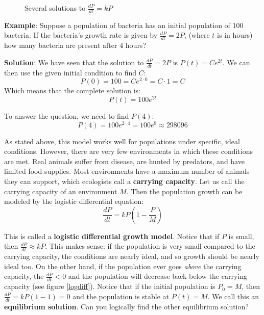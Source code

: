 \begin{figure}[htbp]
\centering
    \caption{Several solutions to $\frac{dP}{dt} = kP$}
    \label{expdiff}
\end{figure}


\textbf{Example}: Suppose a population of bacteria has an initial population 
of 100 bacteria. If the bacteria's growth rate is given by $\frac{dP}{dt} = 
2P$, (where $t$ is in hours) how many bacteria are present after 4 hours?

\textbf{Solution}: We have seen that the solution to $\frac{dP}{dt} = 2P$ is 
$P(t) = Ce^{2t}$. We can then use the given initial condition to find $C$:
$$P(0) = 100 = Ce^{2 \cdot 0} = C \cdot 1 = C$$
Which means that the complete solution is:
$$P(t) = 100 e^{2t}$$

To answer the question, we need to find $P(4)$:
$$P(4) = 100 e^{2 \cdot 4} = 100 e^{8} \approx 298096$$

As stated above, this model works well for populations under specific, ideal 
conditions. However, there are very few environments in which these conditions 
are met. Real animals suffer from disease, are hunted by predators, and have 
limited food supplies. Most environments have a maximum number of animals they 
can support, which ecologists call a \textbf{carrying capacity}. Let us call the carrying capacity of an environment $M$. Then the 
population growth can be modeled by the logistic differential equation: 
$$\frac{dP}{dt} = kP \left( 1 - \frac{P}{M} \right)$$

This is called a \textbf{logistic differential growth model}. Notice that if $P$ is small, then $\frac{dP}{dt} 
\approx kP$. This makes sense: if the population is very small compared to the 
carrying capacity, the conditions are nearly ideal, and so growth should be 
nearly ideal too. On the other hand, if the population ever goes \textit{
above} the carrying capacity, the $\frac{dP}{dt} < 0$ and the population will 
decrease back below the carrying capacity (see figure \ref{logdiff}). Notice 
that if the initial population is $P_0 = M$, then $\frac{dP}{dt} = kP \left( 1 
- 1 \right) = 0$ and the population is stable at $P(t) = M$. We call this an 
\textbf{equilibrium solution}. Can you logically 
find the other equilibrium solution? 

